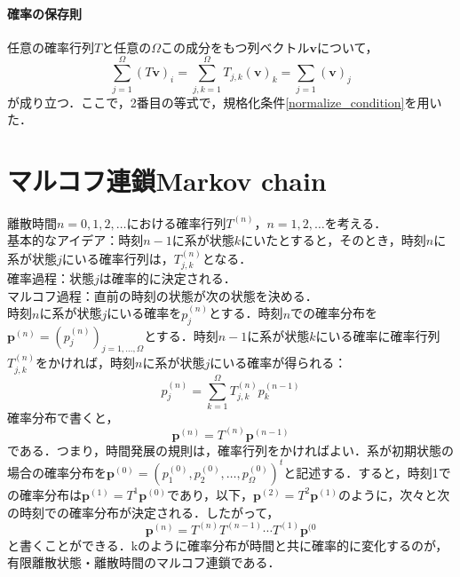 \paragraph{確率の保存則}
任意の確率行列$T$と任意の$\Omega$この成分をもつ列ベクトル$\bm{v}$について，
\begin{equation}
    \sum_{j=1}^{\Omega} (T\bm{v})_i = \sum_{j,k=1}^{\Omega}T_{j,k}(\bm{v})_k = \sum_{j=1}(\bm{v})_j 
\end{equation}
が成り立つ．ここで，2番目の等式で，規格化条件\eqref{normalize_condition}を用いた．





\section{マルコフ連鎖Markov chain}
離散時間$n=0,1,2,\ldots$における確率行列$T^{(n)}$，$n=1,2,\ldots$を考える．\\
基本的なアイデア：時刻$n-1$に系が状態$k$にいたとすると，そのとき，時刻$n$に系が状態$j$にいる確率行列は，$T_{j,k}^{(n)}$となる．\\
確率過程：状態$j$は確率的に決定される．\\
マルコフ過程：直前の時刻の状態が次の状態を決める．\\

時刻$n$に系が状態$j$にいる確率を$p_j^{(n)}$とする．時刻$n$での確率分布を$\bm{p}^{(n)}=(p_j^{(n)})_{j=1,\ldots,\Omega}$とする．時刻$n-1$に系が状態$k$にいる確率に確率行列$T_{j,k}^{(n)}$をかければ，時刻$n$に系が状態$j$にいる確率が得られる：
\begin{equation}
    p_{j}^{(n)}=\sum_{k=1}^{\Omega}T_{j,k}^{(n)}p_k^{(n-1)}
\end{equation}
確率分布で書くと，
\begin{equation}
    \bm{p}^{(n)}=T^{(n)}\bm{p}^{(n-1)}
\end{equation}
である．つまり，時間発展の規則は，確率行列をかければよい．系が初期状態の場合の確率分布を$\bm{p}^{(0)}=(p_1^{(0)},p_2^{(0)},\ldots,p_{\Omega}^{(0)})^{t}$と記述する．すると，時刻1での確率分布は$\bm{p}^{(1)}=T^{1}\bm{p}^{(0)}$であり，以下，$\bm{p}^{(2)}=T^{2}\bm{p}^{(1)}$のように，次々と次の時刻での確率分布が決定される．したがって，
\begin{equation}
    \bm{p}^{(n)}=T^{(n)}T^{(n-1)}\cdots T^{(1)}\bm{p}^{(0}
\end{equation}
と書くことができる．kのように確率分布が時間と共に確率的に変化するのが，有限離散状態・離散時間のマルコフ連鎖である．



